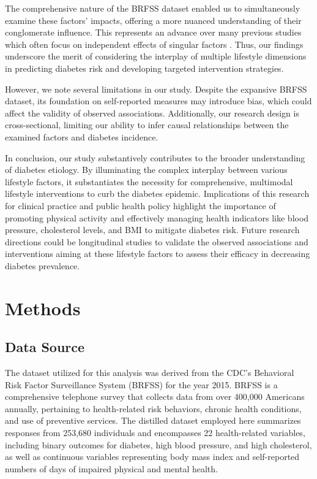 \documentclass[11pt]{article}
\begin{document}
The comprehensive nature of the BRFSS dataset enabled us to simultaneously examine these factors' impacts, offering a more nuanced understanding of their conglomerate influence. This represents an advance over many previous studies which often focus on independent effects of singular factors \cite{Stamler1993DiabetesOR, Chan1994ObesityFD}. Thus, our findings underscore the merit of considering the interplay of multiple lifestyle dimensions in predicting diabetes risk and developing targeted intervention strategies.

However, we note several limitations in our study. Despite the expansive BRFSS dataset, its foundation on self-reported measures may introduce bias, which could affect the validity of observed associations. Additionally, our research design is cross-sectional, limiting our ability to infer causal relationships between the examined factors and diabetes incidence.

In conclusion, our study substantively contributes to the broader understanding of diabetes etiology. By illuminating the complex interplay between various lifestyle factors, it substantiates the necessity for comprehensive, multimodal lifestyle interventions to curb the diabetes epidemic. Implications of this research for clinical practice and public health policy highlight the importance of promoting physical activity and effectively managing health indicators like blood pressure, cholesterol levels, and BMI to mitigate diabetes risk. Future research directions could be longitudinal studies to validate the observed associations and interventions aiming at these lifestyle factors to assess their efficacy in decreasing diabetes prevalence.

\section*{Methods}

\subsection*{Data Source}
The dataset utilized for this analysis was derived from the CDC's Behavioral Risk Factor Surveillance System (BRFSS) for the year 2015. BRFSS is a comprehensive telephone survey that collects data from over 400,000 Americans annually, pertaining to health-related risk behaviors, chronic health conditions, and use of preventive services. The distilled dataset employed here summarizes responses from 253,680 individuals and encompasses 22 health-related variables, including binary outcomes for diabetes, high blood pressure, and high cholesterol, as well as continuous variables representing body mass index and self-reported numbers of days of impaired physical and mental health.
\end{document}
